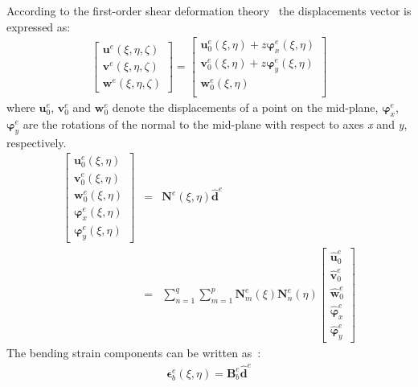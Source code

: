 \documentclass[materials,article,submit,moreauthors,pdftex]{Definitions/mdpi}
\begin{document}
{According to the first-order shear deformation theory~\cite{reissner1945effect, mindlin1951influence} the displacements vector is expressed as:
\begin{eqnarray}
\left [ \begin{array}{c}
\textbf{u}^e(\xi,\eta,\zeta) \\
\textbf{v}^e(\xi,\eta,\zeta) \\
\textbf{w}^e(\xi,\eta,\zeta)
\end{array} \right] = 
\left [ \begin{array}{c}
\textbf{u}_0^e(\xi,\eta) + z\boldsymbol{\varphi}_x^e(\xi,\eta)\\
\textbf{v}_0^e(\xi,\eta) + z\boldsymbol{\varphi}_y^e(\xi,\eta)\\
\textbf{w}_0^e(\xi,\eta) \\
\end{array} \right]
\end{eqnarray}
where \(\textbf{u}_0^e\), \(\textbf{v}_0^e\) and \(\textbf{w}_0^e\) denote the displacements of a point on the mid-plane, \(\boldsymbol{\varphi}_x^e\), \(\boldsymbol{\varphi}_y^e\) are the rotations of the normal to the mid-plane with respect to axes \textit{x} and \textit{y}, respectively.
\begin{eqnarray}
\left [ \begin{array}{c}
\textbf{u}_0^e(\xi,\eta) \\
\textbf{v}_0^e(\xi,\eta) \\
\textbf{w}_0^e(\xi,\eta) \\
\boldsymbol{\varphi}_x^e(\xi,\eta) \\
\boldsymbol{\varphi}_y^e(\xi,\eta)
\end{array} \right]
& = & \textbf{N}^e(\xi,\eta)\widehat{\textbf{d}}^e\nonumber\\
& = & \sum_{n=1}^q\sum_{m=1}^p\textbf{N}_m^e(\xi)\textbf{N}_n^e(\eta)
\left [ \begin{array}{c}
\widehat{\textbf{u}}_0^e \\
\widehat{\textbf{v}}_0^e \\
\widehat{\textbf{w}}_0^e \\
\widehat{\boldsymbol{\varphi}}_x^e \\
\widehat{\boldsymbol{\varphi}}_y^e
\end{array} \right]
\end{eqnarray}
The bending strain components can be written as~\cite{ferreira2008matlab}:
\begin{eqnarray}
\boldsymbol{\epsilon}_b^e(\xi,\eta)=\textbf{B}_b^e\widehat{\textbf{d}}^e

\end{eqnarray}}
\end{document}
